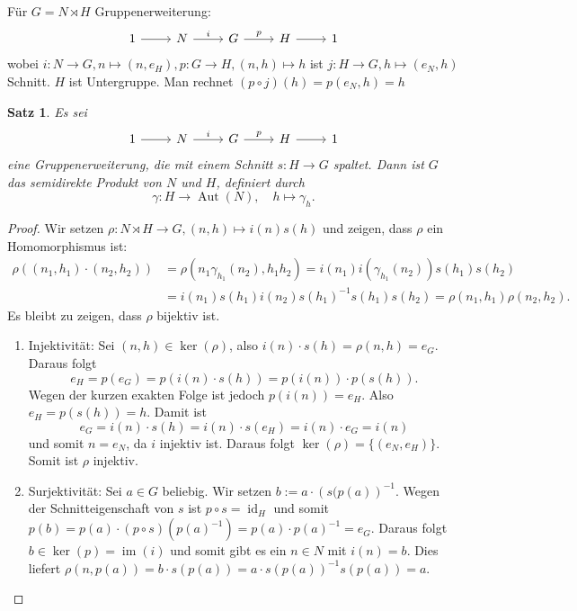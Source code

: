 \documentclass[12pt]{scrartcl} %
\DeclareMathOperator{\id}{id}
\DeclareMathOperator{\im}{im}
\DeclareMathOperator{\Aut}{Aut}
\newcommand{\inv}[1]{\left(#1\right)^{-1}}
\newcommand{\Inv}[1]{#1^{-1}}
\newtheorem{thm}{Satz}
\theoremstyle{definition}
\theoremstyle{remark}
\begin{document}
Für $G=N\rtimes H$ Gruppenerweiterung:
\[ \begin{tikzcd}
		1 \arrow[r] & N \arrow[r,"i"] & G \arrow[r,"p"] & H \arrow[r] & 1
\end{tikzcd} \]
wobei $i: N\to G, n\mapsto (n,e_H), p:G\to H, (n,h)\mapsto h$ ist $j:H\to G, h\mapsto (e_N,h)$ Schnitt. $H$ ist Untergruppe. Man rechnet $(p\circ j)(h)=p(e_N,h)=h$

\begin{thm}
	Es sei
	\[ \begin{tikzcd}
		1 \arrow[r] & N \arrow[r,"i"] & G \arrow[r,"p"] & H \arrow[r] & 1
	\end{tikzcd} \]
	eine Gruppenerweiterung, die mit einem Schnitt $s:H\to G$ spaltet. Dann ist $G$ das semidirekte Produkt von $N$ und $H$, definiert durch $$\gamma: H\to \Aut(N), \quad h\mapsto \gamma_h.$$ %
\end{thm}

\begin{proof}
	Wir setzen $\rho: N\rtimes H \to G, (n,h)\mapsto i(n)s(h)$ und zeigen, dass $\rho$ ein Homomorphismus ist:
	\begin{align*}
		\rho((n_1,h_1)\cdot (n_2,h_2)) &= \rho(n_1\gamma_{h_1}(n_2), h_1h_2) = i(n_1)i(\gamma_{h_1}(n_2))s(h_1)s(h_2)\\
		&= i(n_1)s(h_1)i(n_2)\Inv{s(h_1)}s(h_1)s(h_2) = \rho(n_1,h_1)\rho(n_2,h_2).
	\end{align*}
	Es bleibt zu zeigen, dass $\rho$ bijektiv ist.
	\begin{enumerate}
	\item Injektivität: Sei $(n,h)\in \ker(\rho)$, also \(i(n)\cdot s(h) = \rho(n, h) = e_G\).
		Daraus folgt \[e_H = p(e_G) = p(i(n)\cdot s(h)) = p(i(n))\cdot p(s(h)).\]
		Wegen der kurzen exakten Folge ist jedoch $p(i(n)) = e_H$.
		Also $e_H = p(s(h)) = h$.
		Damit ist \[e_G = i(n)\cdot s(h) = i(n)\cdot s(e_H) = i(n)\cdot e_G = i(n)\] und somit $n=e_N$, da $i$ injektiv ist.
		Daraus folgt $\ker(\rho) = \{(e_N,e_H)\}$.
		Somit ist $\rho$ injektiv.
	\item Surjektivität: Sei $a\in G$ beliebig.
		Wir setzen $b := a\cdot\inv{s(p(a)}$.
		Wegen der Schnitteigenschaft von $s$ ist $p\circ s = \id_H$ und somit $p(b) = p(a)\cdot (p\circ s)(\Inv{p(a)})=p(a)\cdot\Inv{p(a)}=e_G$.
		Daraus folgt $b\in\ker(p)= \im(i)$ und somit gibt es ein $n\in N$ mit $i(n) = b$.
		Dies liefert $\rho(n,p(a)) = b\cdot s(p(a))=a\cdot s(p(a))^{-1}s(p(a))=a$. \qedhere
	\end{enumerate}
\end{proof}
\end{document}
